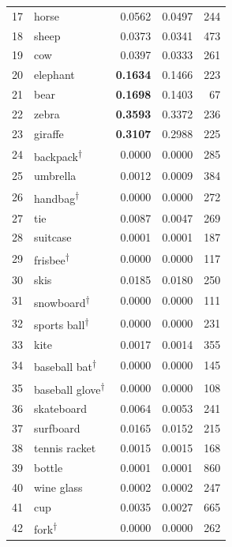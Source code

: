 \begin{longtable}{rlrrr}
17 & horse           & 0.0562 & 0.0497 &    244 \\
18 & sheep           & 0.0373 & 0.0341 &    473 \\
19 & cow             & 0.0397 & 0.0333 &    261 \\
20 & elephant        & \textbf{0.1634} & 0.1466 &    223 \\
21 & bear            & \textbf{0.1698} & 0.1403 &     67 \\
22 & zebra           & \textbf{0.3593} & 0.3372 &    236 \\
23 & giraffe         & \textbf{0.3107} & 0.2988 &    225 \\
24 & backpack\textsuperscript{$\dagger$}        & 0.0000 & 0.0000 &    285 \\
25 & umbrella        & 0.0012 & 0.0009 &    384 \\
26 & handbag\textsuperscript{$\dagger$}         & 0.0000 & 0.0000 &    272 \\
27 & tie             & 0.0087 & 0.0047 &    269 \\
28 & suitcase        & 0.0001 & 0.0001 &    187 \\
29 & frisbee\textsuperscript{$\dagger$}         & 0.0000 & 0.0000 &    117 \\
30 & skis            & 0.0185 & 0.0180 &    250 \\
31 & snowboard\textsuperscript{$\dagger$}       & 0.0000 & 0.0000 &    111 \\
32 & sports ball\textsuperscript{$\dagger$}     & 0.0000 & 0.0000 &    231 \\
33 & kite            & 0.0017 & 0.0014 &    355 \\
34 & baseball bat\textsuperscript{$\dagger$}    & 0.0000 & 0.0000 &    145 \\
35 & baseball glove\textsuperscript{$\dagger$}  & 0.0000 & 0.0000 &    108 \\
36 & skateboard      & 0.0064 & 0.0053 &    241 \\
37 & surfboard       & 0.0165 & 0.0152 &    215 \\
38 & tennis racket   & 0.0015 & 0.0015 &    168 \\
39 & bottle          & 0.0001 & 0.0001 &    860 \\
40 & wine glass      & 0.0002 & 0.0002 &    247 \\
41 & cup             & 0.0035 & 0.0027 &    665 \\
42 & fork\textsuperscript{$\dagger$}            & 0.0000 & 0.0000 &    262 \\

\end{longtable}
